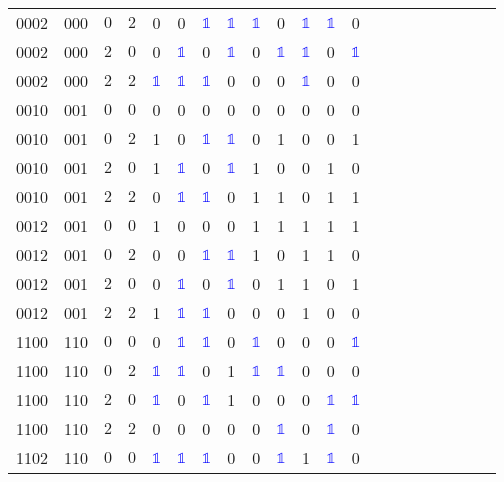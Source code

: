 \begin{longtable*}{c| cccccccccccccccccccc }
0002& 000& $0$& $2$& 0& 0& \textcolor{blue}{$\mathds{1}$}& \textcolor{blue}{$\mathds{1}$}& \textcolor{blue}{$\mathds{1}$}& 0& \textcolor{blue}{$\mathds{1}$}& \textcolor{blue}{$\mathds{1}$}& 0\\
0002& 000& $2$& $0$& 0& \textcolor{blue}{$\mathds{1}$}& 0& \textcolor{blue}{$\mathds{1}$}& 0& \textcolor{blue}{$\mathds{1}$}& \textcolor{blue}{$\mathds{1}$}& 0& \textcolor{blue}{$\mathds{1}$}\\
0002& 000& $2$& $2$& \textcolor{blue}{$\mathds{1}$}& \textcolor{blue}{$\mathds{1}$}& \textcolor{blue}{$\mathds{1}$}& 0& 0& 0& \textcolor{blue}{$\mathds{1}$}& 0& 0\\
0010& 001& $0$& $0$& 0& 0& 0& 0& 0& 0& 0& 0& 0\\
0010& 001& $0$& $2$& 1& 0& \textcolor{blue}{$\mathds{1}$}& \textcolor{blue}{$\mathds{1}$}& 0& 1& 0& 0& 1\\
0010& 001& $2$& $0$& 1& \textcolor{blue}{$\mathds{1}$}& 0& \textcolor{blue}{$\mathds{1}$}& 1& 0& 0& 1& 0\\
0010& 001& $2$& $2$& 0& \textcolor{blue}{$\mathds{1}$}& \textcolor{blue}{$\mathds{1}$}& 0& 1& 1& 0& 1& 1\\
0012& 001& $0$& $0$& 1& 0& 0& 0& 1& 1& 1& 1& 1\\
0012& 001& $0$& $2$& 0& 0& \textcolor{blue}{$\mathds{1}$}& \textcolor{blue}{$\mathds{1}$}& 1& 0& 1& 1& 0\\
0012& 001& $2$& $0$& 0& \textcolor{blue}{$\mathds{1}$}& 0& \textcolor{blue}{$\mathds{1}$}& 0& 1& 1& 0& 1\\
0012& 001& $2$& $2$& 1& \textcolor{blue}{$\mathds{1}$}& \textcolor{blue}{$\mathds{1}$}& 0& 0& 0& 1& 0& 0\\
1100& 110& $0$& $0$& 0& \textcolor{blue}{$\mathds{1}$}& \textcolor{blue}{$\mathds{1}$}& 0& \textcolor{blue}{$\mathds{1}$}& 0& 0& 0& \textcolor{blue}{$\mathds{1}$}\\
1100& 110& $0$& $2$& \textcolor{blue}{$\mathds{1}$}& \textcolor{blue}{$\mathds{1}$}& 0& 1& \textcolor{blue}{$\mathds{1}$}& \textcolor{blue}{$\mathds{1}$}& 0& 0& 0\\
1100& 110& $2$& $0$& \textcolor{blue}{$\mathds{1}$}& 0& \textcolor{blue}{$\mathds{1}$}& 1& 0& 0& 0& \textcolor{blue}{$\mathds{1}$}& \textcolor{blue}{$\mathds{1}$}\\
1100& 110& $2$& $2$& 0& 0& 0& 0& 0& \textcolor{blue}{$\mathds{1}$}& 0& \textcolor{blue}{$\mathds{1}$}& 0\\
1102& 110& $0$& $0$& \textcolor{blue}{$\mathds{1}$}& \textcolor{blue}{$\mathds{1}$}& \textcolor{blue}{$\mathds{1}$}& 0& 0& \textcolor{blue}{$\mathds{1}$}& 1& \textcolor{blue}{$\mathds{1}$}& 0\\

\end{longtable*}
